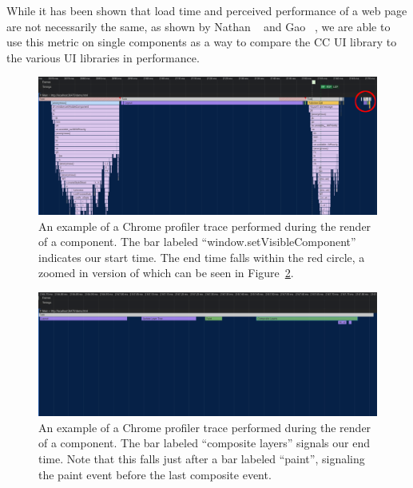 While it has been shown that load time and perceived performance of a web page are not necessarily the same, as shown by Nathan \etal{}~\cite{nathan2018measuring} and Gao \etal{}~\cite{gao2017perceived}, we are able to use this metric on single components as a way to compare the CC UI library to the various UI libraries in performance.

\begin{figure}[h]
  \includegraphics[width=\columnwidth]{figures/experimental-setup/render-time-highlighted.png}
  \caption{An example of a Chrome profiler trace performed during the render of a component. The bar labeled ``window.setVisibleComponent'' indicates our start time. The end time falls within the red circle, a zoomed in version of which can be seen in Figure~\ref{fig:experimental-setup:render-time-end}.}
  \label{fig:experimental-setup:render-time-start}
  \centering
\end{figure}

\begin{figure}[h]
  \includegraphics[width=\columnwidth]{figures/experimental-setup/render-time-zoomed.png}
  \caption{An example of a Chrome profiler trace performed during the render of a component. The bar labeled ``composite layers'' signals our end time. Note that this falls just after a bar labeled ``paint'', signaling the paint event before the last composite event.}
  \label{fig:experimental-setup:render-time-end}
  \centering
\end{figure}

